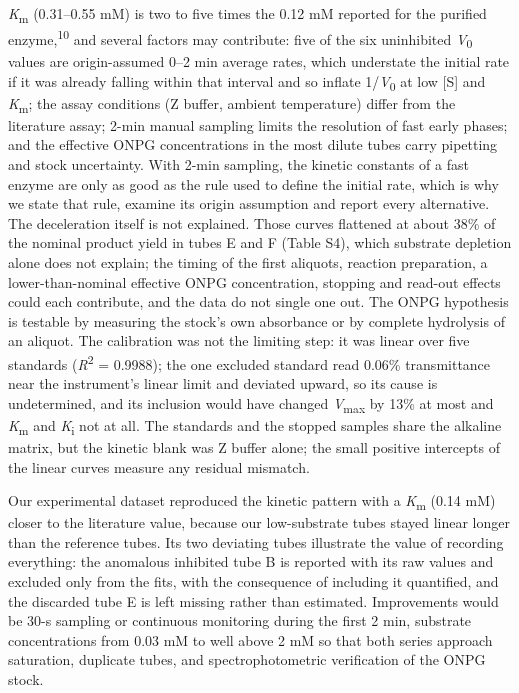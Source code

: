 \documentclass[9pt,twocolumn]{extarticle}
\newcommand{\cit}[1]{\textsuperscript{#1}}
\newcommand{\Km}{\textit{K}\textsubscript{m}}
\newcommand{\Vmax}{\textit{V}\textsubscript{max}}
\newcommand{\Vo}{\textit{V}\textsubscript{0}}
\newcommand{\Ki}{\textit{K}\textsubscript{i}}
\newcommand{\Rsq}{\textit{R}\textsuperscript{2}}
\newcommand{\dash}{–}
\begin{document}
\Km{} (0.31\dash0.55 mM) is two to five times the 0.12 mM reported for the purified enzyme,\cit{10} and several factors may contribute: five of the six uninhibited \Vo{} values are origin-assumed 0\dash 2 min average rates, which understate the initial rate if it was already falling within that interval and so inflate 1/\Vo{} at low [S] and \Km; the assay conditions (Z buffer, ambient temperature) differ from the literature assay; 2-min manual sampling limits the resolution of fast early phases; and the effective ONPG concentrations in the most dilute tubes carry pipetting and stock uncertainty. With 2-min sampling, the kinetic constants of a fast enzyme are only as good as the rule used to define the initial rate, which is why we state that rule, examine its origin assumption and report every alternative. The deceleration itself is not explained. Those curves flattened at about 38\% of the nominal product yield in tubes E and F (Table S4), which substrate depletion alone does not explain; the timing of the first aliquots, reaction preparation, a lower-than-nominal effective ONPG concentration, stopping and read-out effects could each contribute, and the data do not single one out. The ONPG hypothesis is testable by measuring the stock's own absorbance or by complete hydrolysis of an aliquot. The calibration was not the limiting step: it was linear over five standards (\Rsq{} = 0.9988); the one excluded standard read 0.06\% transmittance near the instrument's linear limit and deviated upward, so its cause is undetermined, and its inclusion would have changed \Vmax{} by 13\% at most and \Km{} and \Ki{} not at all. The standards and the stopped samples share the alkaline matrix, but the kinetic blank was Z buffer alone; the small positive intercepts of the linear curves measure any residual mismatch.

Our experimental dataset reproduced the kinetic pattern with a \Km{} (0.14 mM) closer to the literature value, because our low-substrate tubes stayed linear longer than the reference tubes. Its two deviating tubes illustrate the value of recording everything: the anomalous inhibited tube B is reported with its raw values and excluded only from the fits, with the consequence of including it quantified, and the discarded tube E is left missing rather than estimated. Improvements would be 30-s sampling or continuous monitoring during the first 2 min, substrate concentrations from 0.03 mM to well above 2 mM so that both series approach saturation, duplicate tubes, and spectrophotometric verification of the ONPG stock.
\end{document}
